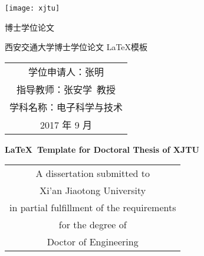 
\begin{titlepage}
	\begin{center}
		\begin{figure*}[!ht]\vspace{5em}
			\centering
			\texttt{[image: xjtu]}
		\end{figure*}
		
		\vspace{1.5em}
		\begin{center} { 博士学位论文} \end{center}
		
		\vspace{8.5em}
		\begin{center} {\sanhao\hei 西安交通大学博士学位论文 \LaTeX 模板}\end{center}
		
		\vspace{16em}
		{\sanhao
			\begin{center} \renewcommand{\arraystretch}{1.75}
				\begin{tabular}{c}
					学位申请人：张明 \\
					指导教师：张安学~教授 \\
					学科名称：电子科学与技术 \\
					2017 年 9 月 \\
				\end{tabular} \renewcommand{\arraystretch}{1}
			\end{center} 
		}
	\end{center}
	\clearpage{\pagestyle{empty}\cleardoublepage}
	
	\newpage\thispagestyle{empty}
	\begin{center}
		\parbox[t][0.7cm][t]{\textwidth}{}
		
		\begin{center}{\sanhao\bfseries \LaTeX~Template for Doctoral Thesis of XJTU}\end{center}
		
		\vspace{4.7cm}
		{\sanhao
			\begin{center} \renewcommand{\arraystretch}{1.4}
				\begin{tabular}{c}
					A dissertation submitted to  \\
					Xi'an Jiaotong University \\
					in partial fulfillment of the requirements \\
					for the degree of \\
					Doctor of Engineering \\
				\end{tabular} \renewcommand{\arraystretch}{1}
			\end{center} 
		}
			

\end{center}
\end{titlepage}
